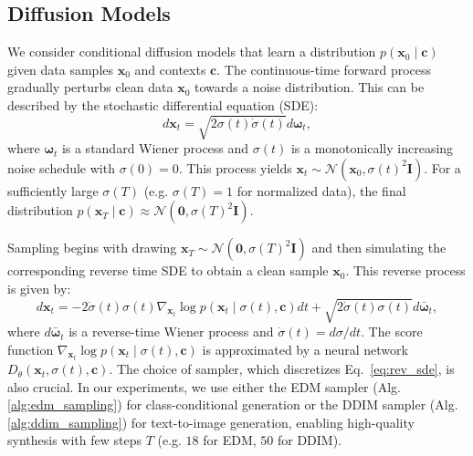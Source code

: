 \documentclass{article}
\newcommand{\calN}{\mathcal{N}} %
\newcommand{\matI}{\mathbf{I}}   %
\begin{document}
\subsection{Diffusion Models} 
%
We consider conditional diffusion models that learn a distribution $p(\mathbf{x}_0\mid \mathbf{c})$ given data samples $\mathbf{x}_0$ and contexts $\mathbf{c}$. The continuous-time forward process gradually perturbs clean data $\mathbf{x}_0$ towards a noise distribution. This can be described by the stochastic differential equation (SDE):
\begin{equation}
d\mathbf{x}_t = \sqrt{2\sigma(t)\dot{\sigma}(t)} d\boldsymbol{\omega}_t,
\label{eq:fwd_sde}
\end{equation}
where $\boldsymbol{\omega}_t$ is a standard Wiener process and $\sigma(t)$ is a monotonically increasing noise schedule with $\sigma(0)=0$. This process yields $\mathbf{x}_t \sim \calN(\mathbf{x}_0, \sigma(t)^2\matI)$. For a sufficiently large $\sigma(T)$ (e.g. $\sigma(T)=1$ for normalized data), the final distribution $p(\mathbf{x}_T \mid \mathbf{c}) \approx \calN(\mathbf{0}, \sigma(T)^2\matI)$.

Sampling begins with drawing $\mathbf{x}_T \sim \calN(\mathbf{0}, \sigma(T)^2\matI)$ and then simulating the corresponding reverse time SDE to obtain a clean sample $\mathbf{x}_0$. This reverse process is given by:
\begin{equation}
d\mathbf{x}_t = -2\dot{\sigma}(t)\sigma(t)\nabla_{\mathbf{x}_t} \log p(\mathbf{x}_t\mid\sigma(t), \mathbf{c})dt + \sqrt{2\dot{\sigma}(t)\sigma(t)}d\bar{\boldsymbol{\omega}}_t,
\label{eq:rev_sde}
\end{equation}
where $d\bar{\boldsymbol{\omega}}_t$ is a reverse-time Wiener process and $\dot{\sigma}(t) = d\sigma/dt$. The score function $\nabla_{\mathbf{x}_t} \log p(\mathbf{x}_t\mid\sigma(t), \mathbf{c})$ is approximated by a neural network $D_\theta(\mathbf{x}_t, \sigma(t), \mathbf{c})$.
The choice of sampler, which discretizes Eq.~\eqref{eq:rev_sde}, is also crucial. In our experiments, we use either the EDM sampler (Alg. \ref{alg:edm_sampling}) \citep{karras2022elucidatingdesignspacediffusionbased} for class-conditional generation or the DDIM sampler (Alg. \ref{alg:ddim_sampling}) \citep{song2022denoisingdiffusionimplicitmodels} for text-to-image generation, enabling high-quality synthesis with few steps $T$ (e.g. $18$ for EDM, $50$ for DDIM).
\end{document}
